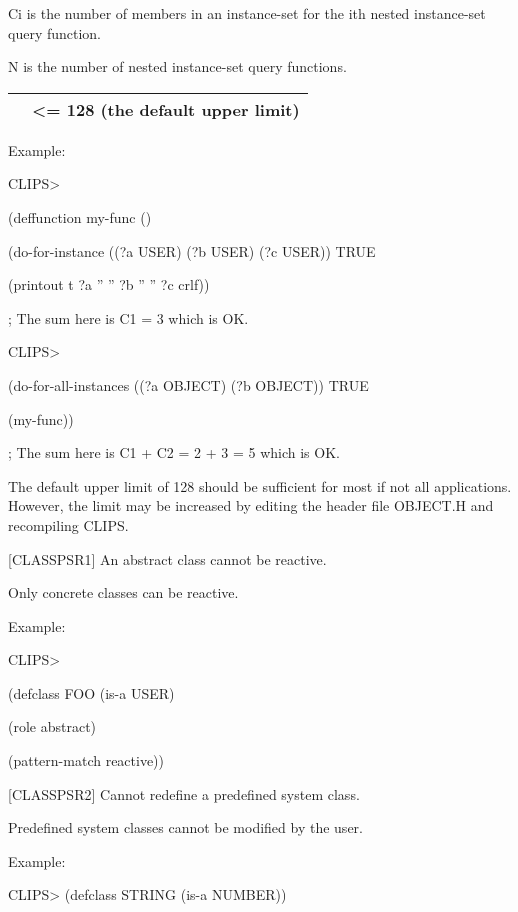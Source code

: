 \documentclass[letterpaper,10pt,english]{sphinxmanual}
\begin{document}
Ci is the number of members in an instance-set for the ith nested
instance-set query function.

N is the number of nested instance-set query functions.


\begin{savenotes}\sphinxattablestart
\centering
\begin{tabulary}{\linewidth}[t]{|T|T|}
\hline

&
\textless{}= 128 (the default upper limit)
\\
\hline
\end{tabulary}
\par
\sphinxattableend\end{savenotes}

Example:

CLIPS\textgreater{}

(deffunction my-func ()

(do-for-instance ((?a USER) (?b USER) (?c USER)) TRUE

(printout t ?a ” ” ?b ” ” ?c crlf))

; The sum here is C1 = 3 which is OK.

CLIPS\textgreater{}

(do-for-all-instances ((?a OBJECT) (?b OBJECT)) TRUE

(my-func))

; The sum here is C1 + C2 = 2 + 3 = 5 which is OK.

The default upper limit of 128 should be sufficient for most if not all
applications. However, the limit may be increased by editing the header
file OBJECT.H and recompiling CLIPS.

{[}CLASSPSR1{]} An abstract class cannot be reactive.

Only concrete classes can be reactive.

Example:

CLIPS\textgreater{}

(defclass FOO (is-a USER)

(role abstract)

(pattern-match reactive))

{[}CLASSPSR2{]} Cannot redefine a predefined system class.

Predefined system classes cannot be modified by the user.

Example:

CLIPS\textgreater{} (defclass STRING (is-a NUMBER))
\end{document}
